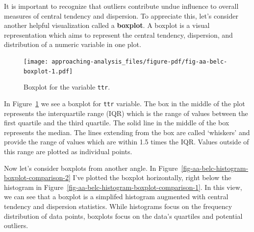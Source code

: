 \documentclass[
  letterpaper,
  DIV=11,
  numbers=noendperiod]{scrreport}
\theoremstyle{definition}
\theoremstyle{remark}
\begin{document}
It is important to recognize that outliers contribute undue influence to
overall measures of central tendency and dispersion. To appreciate this,
let's consider another helpful visualization called a \textbf{boxplot}.
A boxplot is a visual representation which aims to represent the central
tendency, dispersion, and distribution of a numeric variable in one
plot.

\begin{figure}[H]

{\centering \texttt{[image: approaching-analysis\_files/figure-pdf/fig-aa-belc-boxplot-1.pdf]}

}

\caption{\label{fig-aa-belc-boxplot}Boxplot for the variable
\texttt{ttr}.}

\end{figure}

In Figure~\ref{fig-aa-belc-boxplot} we see a boxplot for \texttt{ttr}
variable. The box in the middle of the plot represents the interquartile
range (IQR) which is the range of values between the first quartile and
the third quartile. The solid line in the middle of the box represents
the median. The lines extending from the box are called `whiskers' and
provide the range of values which are within 1.5 times the IQR. Values
outside of this range are plotted as individual points.

Now let's consider boxplots from another angle. In
Figure~\ref{fig-aa-belc-histogram-boxplot-comparison-2} I've plotted the
boxplot horizontally, right below the histogram in
Figure~\ref{fig-aa-belc-histogram-boxplot-comparison-1}. In this view,
we can see that a boxplot is a simplifed histogram augmented with
central tendency and dispersion statistics. While histograms focus on
the frequency distribution of data points, boxplots focus on the data's
quartiles and potential outliers.
\end{document}
